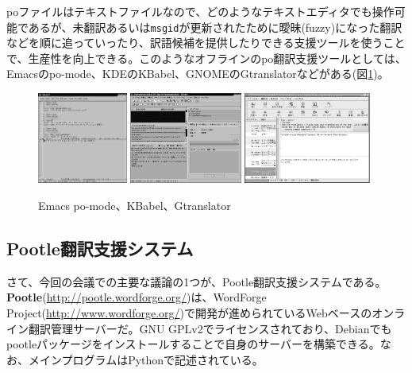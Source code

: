 \documentclass[mingoth,a4paper]{jsarticle}
\begin{document}
poファイルはテキストファイルなので、どのようなテキストエディタでも操作可能であるが、未翻訳あるいは\texttt{msgid}が更新されたために曖昧(fuzzy)になった翻訳などを順に追っていったり、訳語候補を提供したりできる支援ツールを使うことで、生産性を向上できる。このようなオフラインのpo翻訳支援ツールとしては、Emacsのpo-mode、KDEのKBabel、GNOMEのGtranslatorなどがある(図\ref{fig:extremadura-assist})。

\begin{figure}[htbp]
  \begin{center}
    \includegraphics[height=3cm]{image200610/emacs-po.eps}
    \includegraphics[height=3cm]{image200610/kbabel.eps}
    \includegraphics[height=3cm]{image200610/gtranslator.eps}
  \end{center}
  \caption{Emacs po-mode、KBabel、Gtranslator}
  \label{fig:extremadura-assist}
\end{figure}

\subsection{Pootle翻訳支援システム}
\label{sec:extremadura-pootle}

さて、今回の会議での主要な議論の1つが、Pootle翻訳支援システムである。\textbf{Pootle}(\url{http://pootle.wordforge.org/})は、WordForge Project(\url{http://www.wordforge.org/})で開発が進められているWebベースのオンライン翻訳管理サーバーだ。GNU GPLv2でライセンスされており、Debianでもpootleパッケージをインストールすることで自身のサーバーを構築できる。なお、メインプログラムはPythonで記述されている。
\end{document}
